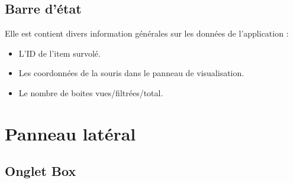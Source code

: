 \documentclass[a4paper]{article}
\begin{document}
\subsection{Barre d'état}
Elle est contient divers information générales sur les données de l'application :
\begin{itemize}
\item L'ID de l'item survolé.
\item Les coordonnées de la souris dans le panneau de visualisation.
\item Le nombre de boites vues/filtrées/total.
\end{itemize}

\section{Panneau latéral}

\subsection{Onglet Box}\label{sec:onglet:box}
\end{document}
